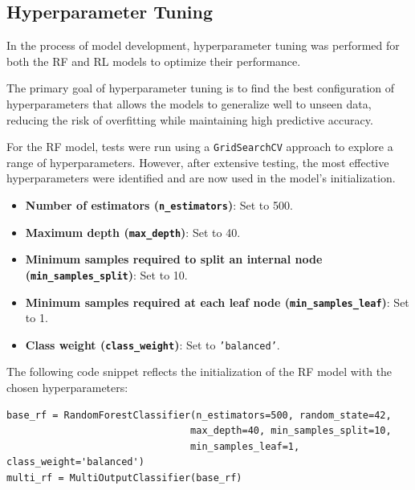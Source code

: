 \subsection{Hyperparameter Tuning}

In the process of model development, hyperparameter tuning was performed for both the \gls{RF} and \gls{RL} models to optimize their performance. 

The primary goal of hyperparameter tuning is to find the best configuration of hyperparameters that allows the models to generalize well to unseen data, reducing the risk of overfitting while maintaining high predictive accuracy.

For the \gls{RF} model, tests were run using a \texttt{GridSearchCV} approach to explore a range of hyperparameters. 
However, after extensive testing, the most effective hyperparameters were identified and are now used in the model's initialization. 

\begin{itemize}
    \item \textbf{Number of estimators (\texttt{n\_estimators})}: Set to 500.
    \item \textbf{Maximum depth (\texttt{max\_depth})}: Set to 40.
    \item \textbf{Minimum samples required to split an internal node (\texttt{min\_samples\_split})}: Set to 10.
    \item \textbf{Minimum samples required at each leaf node (\texttt{min\_samples\_leaf})}: Set to 1.
    \item \textbf{Class weight (\texttt{class\_weight})}: Set to \texttt{'balanced'}.
\end{itemize}

The following code snippet reflects the initialization of the RF model with the chosen hyperparameters:

\vspace{0.2cm}
\noindent
\begin{minipage}{\linewidth}
\begin{verbatim}
base_rf = RandomForestClassifier(n_estimators=500, random_state=42, 
                                max_depth=40, min_samples_split=10, 
                                min_samples_leaf=1, class_weight='balanced')
multi_rf = MultiOutputClassifier(base_rf)
\end{verbatim}
\label{lst:rf_model_initialization}
\end{minipage}
\vspace{0.1cm}

